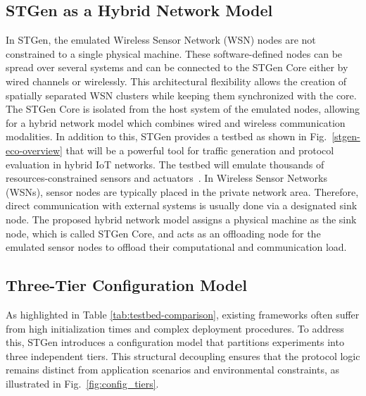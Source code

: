 \documentclass[jsan,article,submit,moreauthors,pdftex]{Definitions/mdpi}
\begin{document}
\subsection{STGen as a Hybrid Network Model}
\label{sub_hybrid_network_model}
In STGen, the emulated Wireless Sensor Network (WSN) nodes are not constrained to a single physical machine. These software-defined nodes can be spread over several systems and can be connected to the STGen Core either by wired channels or wirelessly. This architectural flexibility allows the creation of spatially separated WSN clusters while keeping them synchronized with the core. The STGen Core is isolated from the host system of the emulated nodes, allowing for a hybrid network model which combines wired and wireless communication modalities. In addition to this, STGen provides a testbed as shown in Fig.~\ref{stgen-eco-overview} that will be a powerful tool for traffic generation and protocol evaluation in hybrid {IoT} networks. The testbed will emulate thousands of resources-constrained sensors and actuators~\cite{shelby2022rfc}. In Wireless Sensor Networks (WSNs), sensor nodes are typically placed in the private network area. Therefore, direct communication with external systems is usually done via a designated sink node. The proposed hybrid network model assigns a physical machine as the sink node, which is called STGen Core, and acts as an offloading node for the emulated sensor nodes to offload their computational and communication load.

\subsection{Three-Tier Configuration Model}
\label{sub_three_tier_configuration}

As highlighted in Table \ref{tab:testbed-comparison}, existing frameworks often suffer from high initialization times and complex deployment procedures. To address this, STGen introduces a configuration model that partitions experiments into three independent tiers. This structural decoupling ensures that the protocol logic remains distinct from application scenarios and environmental constraints, as illustrated in Fig.~\ref{fig:config_tiers}.
\end{document}
